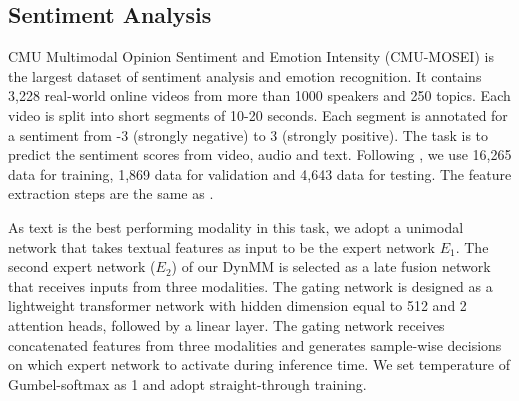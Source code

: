 \subsection{Sentiment Analysis}
CMU Multimodal Opinion Sentiment and Emotion Intensity (CMU-MOSEI) is the largest dataset of sentiment analysis and emotion recognition. It contains 3,228 real-world online videos from more than 1000 speakers and 250 topics.  Each video is split into short segments of 10-20 seconds. Each segment is annotated for a sentiment from -3 (strongly negative) to 3 (strongly positive). The task is to predict the sentiment scores from video, audio and text. Following \cite{multibench}, we use 16,265 data for training, 1,869 data for validation and 4,643 data for testing. The feature extraction steps are the same as \cite{multibench}. 



As text is the best performing modality in this task, we adopt a unimodal network that takes textual features as input to be the expert network $E_1$. The second expert network ($E_2$) of our DynMM is selected as a late fusion network \cite{multibench} that receives inputs from three modalities. The gating network is designed as a lightweight transformer network with hidden dimension equal to 512 and 2 attention heads, followed by a linear layer. The gating network receives concatenated features from three modalities and generates sample-wise decisions on which expert network to activate during inference time. We set temperature of Gumbel-softmax as 1 and adopt straight-through training.

\begin{table}[!tb]
\centering
{}
\caption{Results on CMU-MOSEI Sentiment Analysis. Modalities V, A, T represent video, audio and text, respectively. Acc$^2$ denotes binary accuracy (\ie, positive/negative sentiments) and MAE represents mean absolute error. MAdds are measured with a video-audio-text tuple. Each DynMM variant is obtained using a different value of the regularization hyperparameter $\lambda$ during training.}
\label{tab.mosei}
\end{table}

